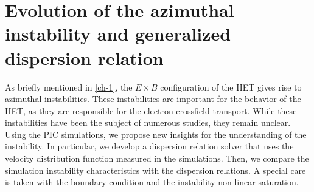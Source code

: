 



\chapter{Evolution of the azimuthal instability and generalized dispersion relation}
\label{ch-5}



\begin{Chabstract}
  
As briefly mentioned in \cref{ch-1}, the $E \times B$ configuration of the \ac{HET} gives rise to azimuthal instabilities.
These instabilities are important for the behavior of the \ac{HET}, as they are responsible for the electron crossfield transport.
While these instabilities have been the subject of numerous studies, they remain unclear.
Using the \ac{PIC} simulations, we propose new insights for the understanding of the instability.
In particular, we develop a dispersion relation solver that uses the velocity distribution function measured in the simulations.
Then, we compare the simulation instability characteristics with the dispersion relations.
A special care is taken with the boundary condition and the instability non-linear saturation.
\end{Chabstract}

% 
% 

\minitoc








